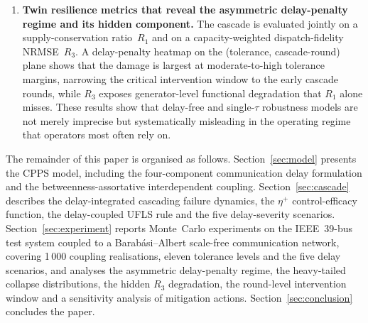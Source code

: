 \begin{enumerate}
\item \textbf{Twin resilience metrics that reveal the asymmetric
  delay-penalty regime and its hidden component.}  The cascade
  is evaluated jointly on a supply-conservation ratio~$R_1$ and on
  a capacity-weighted dispatch-fidelity NRMSE~$R_3$.  A
  delay-penalty heatmap on the (tolerance, cascade-round) plane
  shows that the damage is largest at moderate-to-high tolerance
  margins, narrowing the critical intervention window to the
  early cascade rounds, while $R_3$ exposes generator-level
  functional degradation that $R_1$ alone misses.  These results
  show that delay-free and single-$\tau$ robustness models are
  not merely imprecise but systematically misleading in the
  operating regime that operators most often rely on.

\end{enumerate}

The remainder of this paper is organised as follows.
Section~\ref{sec:model} presents the CPPS model, including the
four-component communication delay formulation and the
betweenness-assortative interdependent coupling.
Section~\ref{sec:cascade} describes the delay-integrated cascading
failure dynamics, the $\eta^{+}$ control-efficacy function, the
delay-coupled UFLS rule and the five delay-severity scenarios.
Section~\ref{sec:experiment} reports Monte~Carlo experiments on the
IEEE~39-bus test system coupled to a Barab\'asi--Albert scale-free
communication network, covering 1\,000 coupling realisations,
eleven tolerance levels and the five delay scenarios, and analyses
the asymmetric delay-penalty regime, the heavy-tailed collapse
distributions, the hidden $R_3$ degradation, the round-level
intervention window and a sensitivity analysis of mitigation
actions.  Section~\ref{sec:conclusion} concludes the paper.



